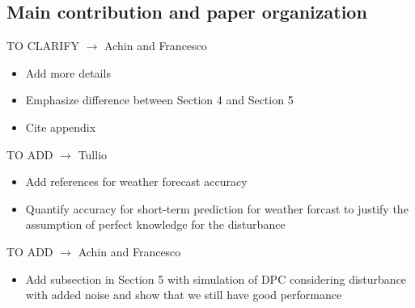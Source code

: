 \subsection{Main contribution and paper organization}
TO CLARIFY $\rightarrow$ \textcolor[rgb]{0,0,1}{Achin and Francesco}
\begin{itemize}
	\item Add more details
	\item Emphasize difference between Section 4 and Section 5
	\item Cite appendix
\end{itemize}
TO ADD $\rightarrow$ \textcolor[rgb]{1,0,0}{Tullio}
\begin{itemize}
	\item Add references for weather forecast accuracy
	\item Quantify accuracy for short-term prediction for weather forcast to justify the assumption of perfect knowledge for the disturbance
\end{itemize}
TO ADD $\rightarrow$ \textcolor[rgb]{0,0,1}{Achin and Francesco}
\begin{itemize}
	\item Add subsection in Section 5 with simulation of DPC considering disturbance with added noise and show that we still have good performance
\end{itemize}
